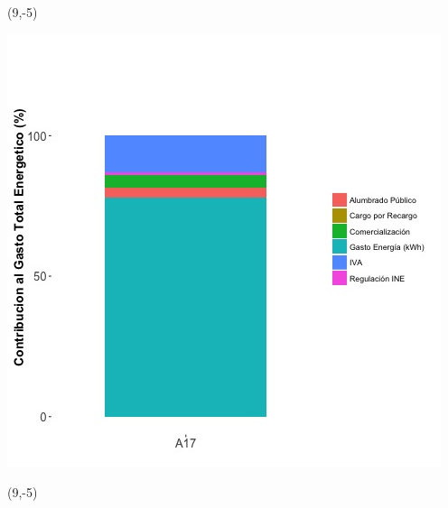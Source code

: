 \documentclass{article}\usepackage[]{graphicx}\usepackage[]{color}
\newenvironment{knitrout}{}{} %
\begin{document}
 \begin{textblock}{1}(9,-5)
\begin{minipage}{20em}
\begingroup

\endgroup
\end{minipage}
\end{textblock}

\begin{knitrout}
\color{fgcolor}
\includegraphics[scale=0.65]{figure/A17_costvars_plot.jpg} 
\end{knitrout}

 \begin{textblock}{1}(9,-5)
\begin{minipage}{20em}
\begingroup

\endgroup
\end{minipage}
\end{textblock}
\end{document}
